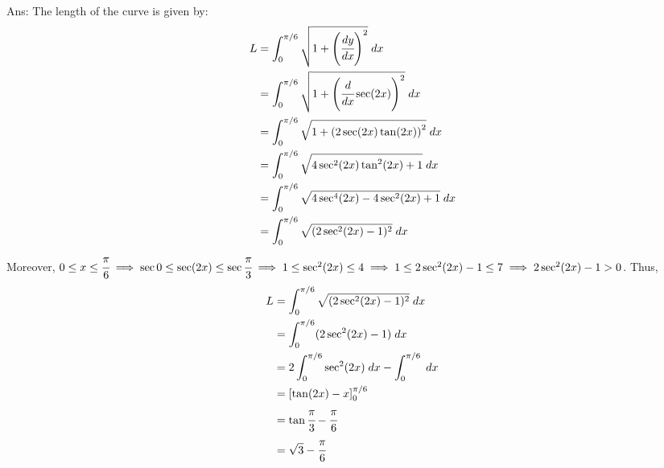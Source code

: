 \documentclass{article}
\begin{document}
\newline
\newline
Ans:
The length of the curve is given by:
\begin{align*}
    L
    &= \displaystyle\int_0^{\pi/6} \sqrt{1+\left(\cfrac{dy}{dx}\right)^2} \; dx \\
    &= \displaystyle\int_0^{\pi/6} \sqrt{1+\left(\cfrac{d}{dx} \sec (2x)\right)^2} \; dx \\
    &= \displaystyle\int_0^{\pi/6} \sqrt{1+\left(2\sec (2x) \tan (2x)\right)^2} \; dx \\
    &= \displaystyle\int_0^{\pi/6} \sqrt{4\sec^{2} (2x) \tan^{2} (2x) + 1} \; dx \\
    &= \displaystyle\int_0^{\pi/6} \sqrt{4\sec^{4} (2x) - 4 \sec^{2} (2x) + 1} \; dx \\
    &= \displaystyle\int_0^{\pi/6} \sqrt{(2 \sec^{2} (2x) -1)^2} \; dx \\
\end{align*}
Moreover,  $0 \leq x \leq \cfrac{\pi}{6} \implies \sec 0 \leq \sec (2x) \leq \sec \cfrac{\pi}{3} \implies 1  \leq  \sec^2 (2x) \leq 4 \implies 1 \leq 2 \sec^{2} (2x) -1 \leq 7 \implies 2 \sec^{2} (2x) -1 > 0$. Thus,
\begin{align*}
    L
    &= \displaystyle\int_0^{\pi/6} \sqrt{(2 \sec^{2} (2x) -1)^2} \; dx \\
    &= \displaystyle\int_0^{\pi/6} (2 \sec^{2} (2x) -1) \; dx \\
    &= 2 \displaystyle\int_0^{\pi/6} \sec^{2} (2x) \; dx - \displaystyle\int_0^{\pi/6} \; dx \\
    &= \left[ \tan (2x) - x\right]_0^{\pi/6} \\
    &= \tan \cfrac{\pi}{3} - \cfrac{\pi}{6} \\
    &= \sqrt{3} - \cfrac{\pi}{6}
\end{align*}

\newpage
\end{document}
